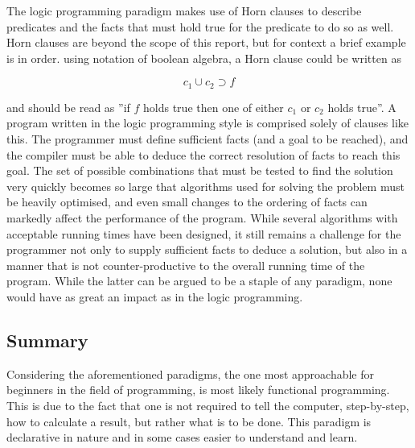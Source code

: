 The logic programming paradigm makes use of Horn clauses to describe predicates and the facts that must hold true for the predicate to do so as well. Horn clauses are beyond the scope of this report, but for context a brief example is in order. using notation of boolean algebra, a Horn clause could be written as 

\[
c_1 \cup c_2 \supset f
\]

and should be read as ''if $f$ holds true then one of either $c_1$ or $c_2$ holds true''. A program written in the logic programming style is comprised solely of clauses like this. The programmer must define sufficient facts (and a goal to be reached), and the compiler must be able to deduce the correct resolution of facts to reach this goal. The set of possible combinations that must be tested to find the solution very quickly becomes so large that algorithms used for solving the problem must be heavily optimised, and even small changes to the ordering of facts can markedly affect the performance of the program. While several algorithms with acceptable running times have been designed, it still remains a challenge for the programmer not only to supply sufficient facts to deduce a solution, but also in a manner that is not counter-productive to the overall running time of the program. While the latter can be argued to be a staple of any paradigm, none would have as great an impact as in the logic programming.

\subsection{Summary}
Considering the aforementioned paradigms, the one most approachable for beginners in the field of programming, is most likely functional programming. This is due to the fact that one is not required to tell the computer, step-by-step, how to calculate a result, but rather what is to be done. This paradigm is declarative in nature and in some cases easier to understand and learn.